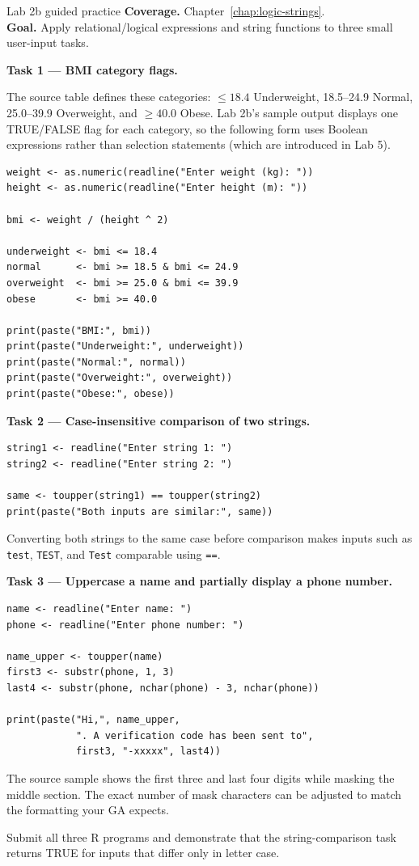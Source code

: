 
\begin{labproject}{Lab 2b guided practice}
\textbf{Coverage.} Chapter~\ref{chap:logic-strings}.\\
\textbf{Goal.} Apply relational/logical expressions and string functions to three small user-input tasks.

\textbf{Task 1 --- BMI category flags.}

The source table defines these categories: \(\le 18.4\) Underweight, 18.5--24.9 Normal, 25.0--39.9 Overweight, and \(\ge 40.0\) Obese. Lab 2b's sample output displays one TRUE/FALSE flag for each category, so the following form uses Boolean expressions rather than selection statements (which are introduced in Lab 5).

\begin{lstlisting}[style=dsr]
weight <- as.numeric(readline("Enter weight (kg): "))
height <- as.numeric(readline("Enter height (m): "))

bmi <- weight / (height ^ 2)

underweight <- bmi <= 18.4
normal      <- bmi >= 18.5 & bmi <= 24.9
overweight  <- bmi >= 25.0 & bmi <= 39.9
obese       <- bmi >= 40.0

print(paste("BMI:", bmi))
print(paste("Underweight:", underweight))
print(paste("Normal:", normal))
print(paste("Overweight:", overweight))
print(paste("Obese:", obese))
\end{lstlisting}

\textbf{Task 2 --- Case-insensitive comparison of two strings.}

\begin{lstlisting}[style=dsr]
string1 <- readline("Enter string 1: ")
string2 <- readline("Enter string 2: ")

same <- toupper(string1) == toupper(string2)
print(paste("Both inputs are similar:", same))
\end{lstlisting}

Converting both strings to the same case before comparison makes inputs such as \texttt{test}, \texttt{TEST}, and \texttt{Test} comparable using \texttt{==}.

\textbf{Task 3 --- Uppercase a name and partially display a phone number.}

\begin{lstlisting}[style=dsr]
name <- readline("Enter name: ")
phone <- readline("Enter phone number: ")

name_upper <- toupper(name)
first3 <- substr(phone, 1, 3)
last4 <- substr(phone, nchar(phone) - 3, nchar(phone))

print(paste("Hi,", name_upper,
            ". A verification code has been sent to",
            first3, "-xxxxx", last4))
\end{lstlisting}

The source sample shows the first three and last four digits while masking the middle section. The exact number of mask characters can be adjusted to match the formatting your GA expects.
\end{labproject}

\begin{labdeliverable}
Submit all three R programs and demonstrate that the string-comparison task returns TRUE for inputs that differ only in letter case.
\end{labdeliverable}
